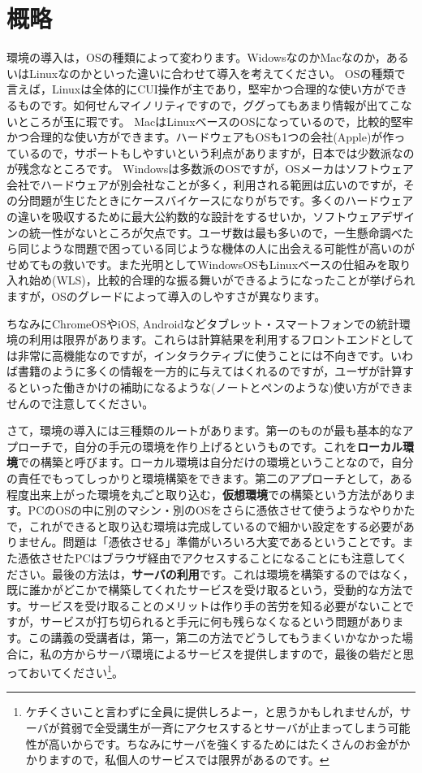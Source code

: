 \documentclass{ltjsbook}
\begin{document}
\section{概略}
環境の導入は，OSの種類によって変わります。WidowsなのかMacなのか，あるいはLinuxなのかといった違いに合わせて導入を考えてください。
OSの種類で言えば，Linuxは全体的にCUI操作が主であり，堅牢かつ合理的な使い方ができるものです。如何せんマイノリティですので，ググってもあまり情報が出てこないところが玉に瑕です。
MacはLinuxベースのOSになっているので，比較的堅牢かつ合理的な使い方ができます。ハードウェアもOSも1つの会社(Apple)が作っているので，サポートもしやすいという利点がありますが，日本では少数派なのが残念なところです。
Windowsは多数派のOSですが，OSメーカはソフトウェア会社でハードウェアが別会社なことが多く，利用される範囲は広いのですが，その分問題が生じたときにケースバイケースになりがちです。多くのハードウェアの違いを吸収するために最大公約数的な設計をするせいか，ソフトウェアデザインの統一性がないところが欠点です。ユーザ数は最も多いので，一生懸命調べたら同じような問題で困っている同じような機体の人に出会える可能性が高いのがせめてもの救いです。また光明としてWindowsOSもLinuxベースの仕組みを取り入れ始め(WLS)，比較的合理的な振る舞いができるようになったことが挙げられますが，OSのグレードによって導入のしやすさが異なります。

ちなみにChromeOSやiOS, Androidなどタブレット・スマートフォンでの統計環境の利用は限界があります。これらは計算結果を利用するフロントエンドとしては非常に高機能なのですが，インタラクティブに使うことには不向きです。いわば書籍のように多くの情報を一方的に与えてはくれるのですが，ユーザが計算するといった働きかけの補助になるような(ノートとペンのような)使い方ができませんので注意してください。

さて，環境の導入には三種類のルートがあります。第一のものが最も基本的なアプローチで，自分の手元の環境を作り上げるというものです。これを\textbf{ローカル環境}での構築と呼びます。ローカル環境は自分だけの環境ということなので，自分の責任でもってしっかりと環境構築をできます。第二のアプローチとして，ある程度出来上がった環境を丸ごと取り込む，\textbf{仮想環境}での構築という方法があります。PCのOSの中に別のマシン・別のOSをさらに憑依させて使うようなやりかたで，これができると取り込む環境は完成しているので細かい設定をする必要がありません。問題は「憑依させる」準備がいろいろ大変であるということです。また憑依させたPCはブラウザ経由でアクセスすることになることにも注意してください。最後の方法は，\textbf{サーバの利用}です。これは環境を構築するのではなく，既に誰かがどこかで構築してくれたサービスを受け取るという，受動的な方法です。サービスを受け取ることのメリットは作り手の苦労を知る必要がないことですが，サービスが打ち切られると手元に何も残らなくなるという問題があります。この講義の受講者は，第一，第二の方法でどうしてもうまくいかなかった場合に，私の方からサーバ環境によるサービスを提供しますので，最後の砦だと思っておいてください\footnote{ケチくさいこと言わずに全員に提供しろよー，と思うかもしれませんが，サーバが貧弱で全受講生が一斉にアクセスするとサーバが止まってしまう可能性が高いからです。ちなみにサーバを強くするためにはたくさんのお金がかかりますので，私個人のサービスでは限界があるのです。}。
\end{document}
